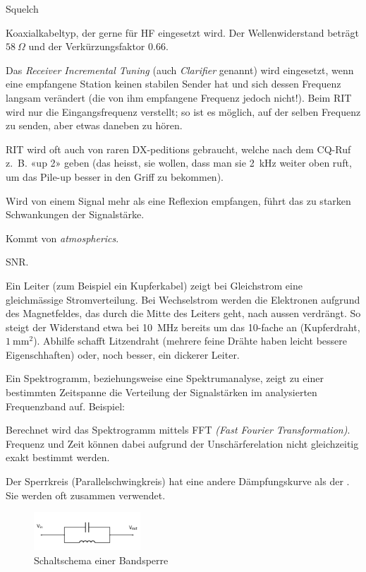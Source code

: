 {}

{Squelch}

{Koaxialkabeltyp, der gerne für HF eingesetzt wird. Der Wellenwiderstand beträgt $58~\Omega$ und der Verkürzungsfaktor 0.66.}

{Das \textit{Receiver Incremental Tuning} (auch \textit{Clarifier} genannt) wird eingesetzt, wenn eine empfangene Station keinen stabilen Sender hat und sich dessen Frequenz langsam verändert (die von ihm empfangene Frequenz jedoch nicht!). Beim RIT wird nur die Eingangsfrequenz verstellt; so ist es möglich, auf der selben Frequenz zu senden, aber etwas daneben zu hören.

RIT wird oft auch von raren DX-peditions gebraucht, welche nach dem CQ-Ruf z. B. «up 2» geben (das heisst, sie wollen, dass man sie 2 kHz weiter oben ruft, um das Pile-up besser in
den Griff zu bekommen).}

{Wird von einem Signal mehr als eine Reflexion empfangen, führt das zu starken Schwankungen der Signalstärke.}

{Kommt von \textit{atmospherics}. }

{SNR. }

{Ein Leiter (zum Beispiel ein Kupferkabel) zeigt bei Gleichstrom eine gleichmässige Stromverteilung. Bei Wechselstrom werden die Elektronen aufgrund des Magnetfeldes, das durch die Mitte des Leiters geht, nach aussen verdrängt. So steigt der Widerstand etwa bei 10 MHz bereits um das 10-fache an (Kupferdraht, $1~\mathrm{mm}^2$). Abhilfe schafft Litzendraht (mehrere feine Drähte haben leicht bessere Eigenschhaften) oder, noch besser, ein dickerer Leiter.}

{}

{Ein Spektrogramm, beziehungsweise eine Spektrumanalyse, zeigt zu einer bestimmten Zeitspanne die Verteilung der Signalstärken im analysierten Frequenzband auf. Beispiel: 

Berechnet wird das Spektrogramm mittels FFT \textit{(Fast Fourier Transformation)}. Frequenz und Zeit können dabei aufgrund der Unschärferelation nicht gleichzeitig exakt bestimmt werden.}

{Der Sperrkreis (Parallelschwingkreis) hat eine andere Dämpfungskurve als der . Sie werden oft zusammen verwendet.

\begin{figure}[h!]
 \centering
 \includegraphics[width=4cm]{./png/Amfu-Schema_Sperrkreis.png}
 \caption{Schaltschema einer Bandsperre}
 \label{fig:sperrkreis}
\end{figure}

}

